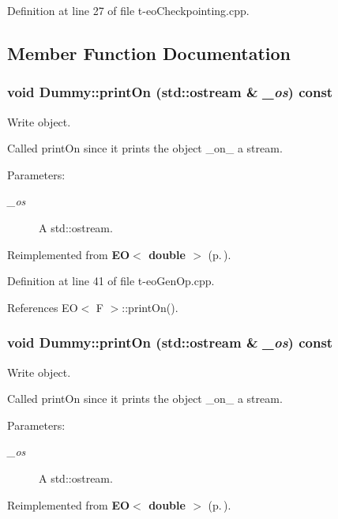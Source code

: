 Definition at line 27 of file t-eo\-Checkpointing.cpp.

\subsection{Member Function Documentation}
\subsubsection{\setlength{\rightskip}{0pt plus 5cm}void Dummy::print\-On (std::ostream \& {\em \_\-os}) const\hspace{0.3cm}{\tt  [inline, virtual]}}\label{struct_dummy_a1}


Write object. 

Called print\-On since it prints the object \_\-on\_\- a stream. \begin{Desc}
\item[Parameters:]
\begin{description}
\item[{\em \_\-os}]A std::ostream. \end{description}
\end{Desc}


Reimplemented from {\bf EO$<$ double $>$} {\rm (p.\,\pageref{class_e_o_z10_2})}.

Definition at line 41 of file t-eo\-Gen\-Op.cpp.

References EO$<$ F $>$::print\-On().
\subsubsection{\setlength{\rightskip}{0pt plus 5cm}void Dummy::print\-On (std::ostream \& {\em \_\-os}) const\hspace{0.3cm}{\tt  [inline, virtual]}}\label{struct_dummy_a2}


Write object. 

Called print\-On since it prints the object \_\-on\_\- a stream. \begin{Desc}
\item[Parameters:]
\begin{description}
\item[{\em \_\-os}]A std::ostream. \end{description}
\end{Desc}


Reimplemented from {\bf EO$<$ double $>$} {\rm (p.\,\pageref{class_e_o_z10_2})}.

